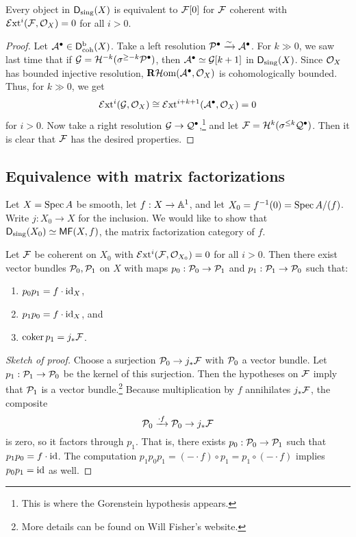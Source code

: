 \documentclass{article}
\begin{document}
\begin{thm}
	Every object in $\Dsing(X)$ is equivalent to $\Fc[0]$ for $\Fc$ coherent with $\scExt^i(\Fc, \Oc_X) = 0$ for all $i > 0$.
\end{thm}

\begin{proof}
	Let $\Ac^\bullet \in \Dbcoh(X)$.
	Take a left resolution $\Pc^\bullet \xrightarrow{\sim} \Ac^\bullet$.
	For $k \gg 0$, we saw last time that if $\Gc = \Hc^{-k}(\sigma^{\geq -k} \Pc^\bullet)$, then $\Ac^\bullet \simeq \Gc[k+1]$ in $\Dsing(X)$.
	Since $\Oc_X$ has bounded injective resolution, $\Rbf \scHom(\Ac^\bullet, \Oc_X)$ is cohomologically bounded.
	Thus, for $k \gg 0$, we get
	\[
		\scExt^i(\Gc, \Oc_X) \cong \scExt^{i+k+1}(\Ac^\bullet, \Oc_X) = 0
	\]
	for $i > 0$.
	Now take a right resolution $\Gc \to \Qc^\bullet$,\footnote{This is where the Gorenstein hypothesis appears.} and let $\Fc = \Hc^k(\sigma^{\leq k} \Qc^\bullet)$.
	Then it is clear that $\Fc$ has the desired properties.
\end{proof}

\subsection{Equivalence with matrix factorizations}

Let $X = \Spec A$ be smooth, let $f: X \to \AA^1$, and let $X_0 = f\inv(0) = \Spec A / (f)$.
Write $j: X_0 \to X$ for the inclusion.
We would like to show that $\Dsing(X_0) \simeq \MF(X, f)$, the matrix factorization category of $f$.

\begin{prop}
	Let $\Fc$ be coherent on $X_0$ with $\scExt^i(\Fc, \Oc_{X_0}) = 0$ for all $i > 0$.
	Then there exist vector bundles $\Pc_0, \Pc_1$ on $X$ with maps $p_0: \Pc_0 \to \Pc_1$ and $p_1: \Pc_1 \to \Pc_0$ such that:
	\begin{enumerate}
		\item $p_0 p_1 = f \cdot \id_X$,
		\item $p_1 p_0 = f \cdot \id_X$, and
		\item $\coker p_1 = j_* \Fc$.
	\end{enumerate}
\end{prop}

\begin{proof}[Sketch of proof]
	Choose a surjection $\Pc_0 \to j_* \Fc$ with $\Pc_0$ a vector bundle.
	Let $p_1: \Pc_1 \to \Pc_0$ be the kernel of this surjection.
	Then the hypotheses on $\Fc$ imply that $\Pc_1$ is a vector bundle.\footnote{More details can be found on Will Fisher's website.}
	Because multiplication by $f$ annihilates $j_* \Fc$, the composite
	\[
		\Pc_0 \xrightarrow{\cdot f} \Pc_0 \to j_* \Fc
	\]
	is zero, so it factors through $p_1$.
	That is, there exists $p_0: \Pc_0 \to \Pc_1$ such that $p_1 p_0 = f \cdot \id$.
	The computation $p_1 p_0 p_1 = (- \cdot f) \circ p_1 = p_1 \circ (- \cdot f)$ implies $p_0 p_1 = \id$ as well.
\end{proof}
\end{document}
